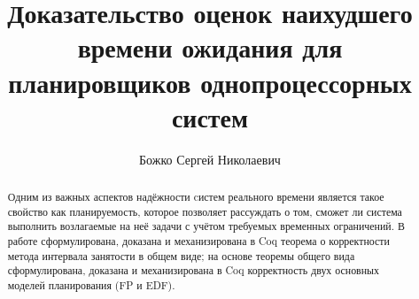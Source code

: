 
\title{Доказательство оценок наихудшего времени ожидания для планировщиков однопроцессорных систем}


\author{Божко Сергей Николаевич}



\maketitle

\begin{abstract}
Одним из важных аспектов надёжности cистем реального времени  является такое свойство как планируемость, которое позволяет рассуждать о том, сможет ли система выполнить возлагаемые на неё задачи с учётом требуемых временных ограничений. В работе сформулирована, доказана и механизирована в Coq теорема о корректности метода интервала занятости в общем виде; на основе теоремы общего вида сформулирована, доказана и механизирована в Coq корректность двух основных моделей планирования (FP и EDF).
\end{abstract}



